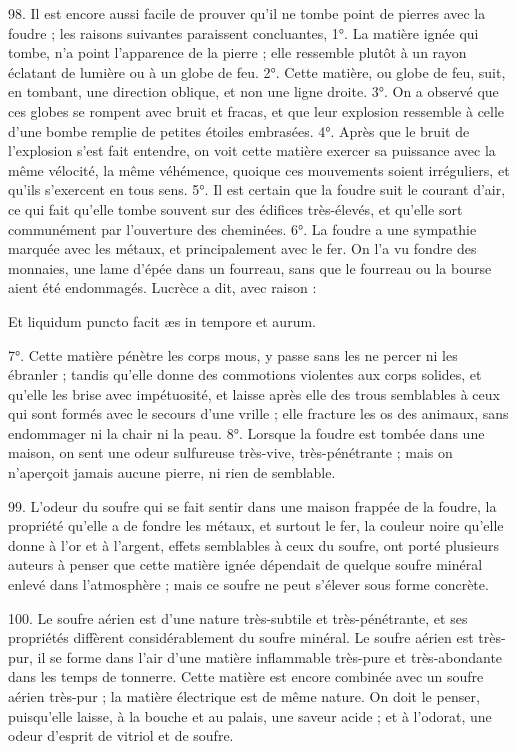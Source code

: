 \documentclass[a4paper, 11pt, oneside, polutonikogreek, french]{article}
\begin{document}
98. Il est encore aussi facile de prouver qu'il ne tombe point de pierres avec la foudre ; les raisons suivantes paraissent concluantes, 1°. La matière ignée qui tombe, n'a point l'apparence de la pierre ; elle ressemble plutôt à un rayon éclatant de lumière ou à un globe de feu. 2°. Cette matière, ou globe de feu, suit, en tombant, une direction oblique, et non une ligne droite. 3°. On a observé que ces globes se rompent avec bruit et fracas, et que leur explosion ressemble à celle d'une bombe remplie de petites étoiles embrasées. 4°. Après que le bruit de l'explosion s'est fait entendre, on voit cette matière exercer sa puissance avec la même vélocité, la même véhémence, quoique ces mouvements soient irréguliers, et qu'ils s'exercent en tous sens. 5°. Il est certain que la foudre suit le courant d'air, ce qui fait qu'elle tombe souvent sur des édifices très-élevés, et qu'elle sort communément par l'ouverture des cheminées. 6°. La foudre a une sympathie marquée avec les métaux, et principalement avec le fer. On l'a vu fondre des monnaies, une lame d'épée dans un fourreau, sans que le fourreau ou la bourse aient été endommagés. Lucrèce a dit, avec raison :

Et liquidum puncto facit æs in tempore et aurum.

7°. Cette matière pénètre les corps mous, y passe sans les ne percer ni les ébranler ; tandis qu'elle donne des commotions violentes aux corps solides, et qu'elle les brise avec impétuosité, et laisse après elle des trous semblables à ceux qui sont formés avec le secours d'une vrille ; elle fracture les os des animaux, sans endommager ni la chair ni la peau. 8°. Lorsque la foudre est tombée dans une maison, on sent une odeur sulfureuse très-vive, très-pénétrante ; mais on n'aperçoit jamais aucune pierre, ni rien de semblable.

99. L'odeur du soufre qui se fait sentir dans une maison frappée de la foudre, la propriété qu'elle a de fondre les métaux, et surtout le fer, la couleur noire qu'elle donne à l'or et à l'argent, effets semblables à ceux du soufre, ont porté plusieurs auteurs à penser que cette matière ignée dépendait de quelque soufre minéral enlevé dans l'atmosphère ; mais ce soufre ne peut s'élever sous forme concrète.

100. Le soufre aérien est d'une nature très-subtile et très-pénétrante, et ses propriétés diffèrent considérablement du soufre minéral. Le soufre aérien est très-pur, il se forme dans l'air d'une matière inflammable très-pure et très-abondante dans les temps de tonnerre. Cette matière est encore combinée avec un soufre aérien très-pur ; la matière électrique est de même nature. On doit le penser, puisqu'elle laisse, à la bouche et au palais, une saveur acide ; et à l'odorat, une odeur d'esprit de vitriol et de soufre.
\end{document}
